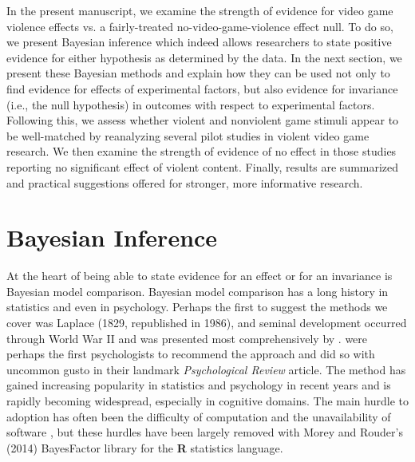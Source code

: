 \documentclass[man]{apa6}
\begin{document}
In the present manuscript, we examine the strength of evidence for video game violence effects vs. a fairly-treated no-video-game-violence effect null.  To do so, we present Bayesian inference which indeed allows researchers to state positive evidence for either hypothesis as determined by the data.  In the next section, we present these Bayesian methods and explain how they can be used not only to find evidence for effects of experimental factors, but also evidence for invariance (i.e., the null hypothesis) in outcomes with respect to experimental factors. Following this, we assess whether violent and nonviolent game stimuli appear to be well-matched by reanalyzing several pilot studies in violent video game research.  We then examine the strength of evidence of no effect in those studies reporting no significant effect of violent content.  Finally, results are summarized and practical suggestions offered for stronger, more informative research. 

\section{Bayesian Inference}
At the heart of being able to state evidence for an effect or for an invariance is Bayesian model comparison.  Bayesian model comparison has a long history in statistics and even in psychology.  Perhaps the first to suggest the methods we cover was Laplace (1829, republished in 1986), and seminal development occurred through World War II %
and was presented most comprehensively by \citet{Jeffreys:1961}.  \citet{Edwards:etal:1963} were perhaps the first psychologists to recommend the approach and did so with uncommon gusto in their landmark {\em Psychological Review} article.  The method has gained increasing popularity in statistics and psychology in recent years \citep{Berger:Delampady:1987,Gallistel:2009,Raftery:1995,Rouder:etal:2009a,Wagenmakers:2007} and is rapidly becoming widespread, especially in cognitive domains. %
The main hurdle to adoption has often been the difficulty of computation and the unavailability of software \citep{Gallistel:2009}, but these hurdles have been largely removed with Morey and Rouder's (2014) BayesFactor library for the {\bf R} statistics language.

\nocite{Laplace:1986,Morey:Rouder:2014}
\end{document}
